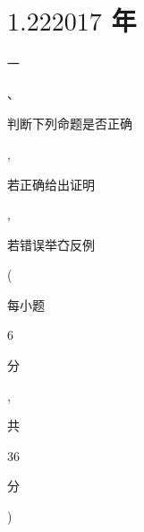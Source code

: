 \documentclass[10pt]{article}
\begin{document}
\section{$1.222017$ 年}
\begin{CJK}{UTF8}{mj}一\end{CJK}、\begin{CJK}{UTF8}{mj}判断下列命题是否正确\end{CJK}, \begin{CJK}{UTF8}{mj}若正确给出证明\end{CJK},\begin{CJK}{UTF8}{mj}若错误举㚎反例\end{CJK} (\begin{CJK}{UTF8}{mj}每小题\end{CJK} 6 \begin{CJK}{UTF8}{mj}分\end{CJK}, \begin{CJK}{UTF8}{mj}共\end{CJK} 36 \begin{CJK}{UTF8}{mj}分\end{CJK})
\end{document}
